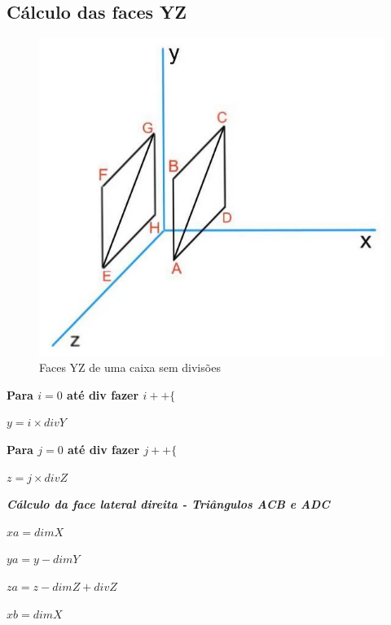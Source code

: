 \documentclass[12pt]{article}
\begin{document}
\subsection{Cálculo das faces YZ}
\begin{figure}[H]
\centering\includegraphics[scale=0.45]{YZ} 
\caption{\label{fig:controller}Faces YZ de uma caixa sem divisões}
\end{figure}
\textbf{Para $ i = 0$ até div fazer $i++\{$} \newline
\par $y = i\times divY$\newline
\par \textbf{Para $ j = 0$ até div fazer $j++\{$} \newline
\par $z = j\times divZ$\newline
\par\textit{\textbf{Cálculo da face lateral direita - Triângulos ACB e ADC}} \newline
\par$xa = dimX$ \newline
\par$ya = y - dimY$ \newline
\par$za = z-dimZ+divZ$ \newline\newline
\par$xb = dimX$ \newline
\end{document}
